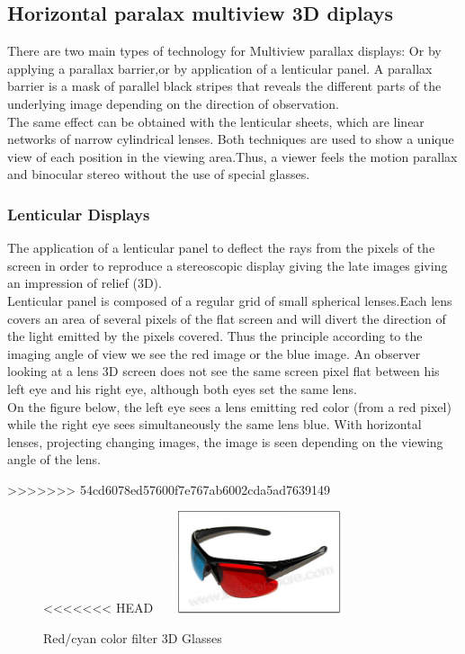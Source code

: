 \subsection{Horizontal paralax multiview 3D diplays} 
There are two main types of technology for Multiview parallax displays: Or by applying a parallax barrier,or by application of a lenticular panel.
A parallax barrier is a mask of parallel black stripes that reveals the different parts of the underlying image depending on the direction of observation.\\ The same effect can be obtained with the lenticular sheets, which are linear networks of narrow cylindrical lenses. Both techniques are used to show a unique view of each position in the viewing area.Thus, a viewer feels the motion parallax and binocular stereo without the use of special glasses. 
\subsubsection{Lenticular Displays}
The application of a lenticular panel to deflect the rays from the pixels of the screen in order to reproduce a stereoscopic display giving the late images giving an impression of relief (3D).\\ Lenticular panel is composed of a regular grid of small spherical lenses.Each lens covers an area of several pixels of the flat screen and will divert the direction of the light emitted by the pixels covered.
Thus the principle according to the imaging angle of view we see the red image or the blue image. An observer looking at a lens 3D screen does not see the same screen pixel flat between his left eye and his right eye, although both eyes set the same lens.\\
On the figure below, the left eye sees a lens emitting red color (from a red pixel) while the right eye sees simultaneously the same lens blue.
With horizontal lenses, projecting changing images, the image is seen depending on the viewing angle of the lens.

>>>>>>> 54cd6078ed57600f7e767ab6002cda5ad7639149

\begin{figure}[h!]
\begin{center}
\begin{minipage}{1\linewidth}
<<<<<<< HEAD
\centering\includegraphics[width=6cm,height=30mm]{image/1.jpg}
\caption{Red/cyan color filter 3D Glasses\cite{ViewingOn3D}}
\end{minipage}
\end{center}
\end{figure}

